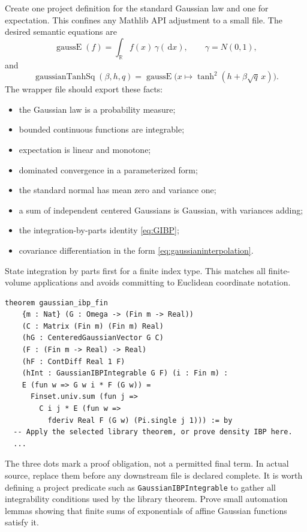 \documentclass[11pt]{article}
\numberwithin{equation}{section}
\newcommand{\R}{\mathbb{R}}
\newcommand{\1}{\mathbf 1}
\newcommand{\dd}{\,\mathrm d}
\begin{document}
Create one project definition for the standard Gaussian law and one for
expectation.  This confines any Mathlib API adjustment to a small file.
The desired semantic equations are
\[
 \operatorname{gaussE}(f)=\int_{\R} f(x)\,\gamma(\dd x),
 \qquad \gamma=N(0,1),
\]
and
\[
 \operatorname{gaussianTanhSq}(\beta,h,q)
 =\operatorname{gaussE}\bigl(x\mapsto
   \tanh^2(h+\beta\sqrt q\,x)\bigr).
\]
The wrapper file should export these facts:
\begin{itemize}[leftmargin=2em]
\item the Gaussian law is a probability measure;
\item bounded continuous functions are integrable;
\item expectation is linear and monotone;
\item dominated convergence in a parameterized form;
\item the standard normal has mean zero and variance one;
\item a sum of independent centered Gaussians is Gaussian, with variances
      adding;
\item the integration-by-parts identity \eqref{eq:GIBP};
\item covariance differentiation in the form
      \eqref{eq:gaussianinterpolation}.
\end{itemize}

State integration by parts first for a finite index type.  This matches all
finite-volume applications and avoids committing to Euclidean coordinate
notation.
\begin{lstlisting}
theorem gaussian_ibp_fin
    {m : Nat} (G : Omega -> (Fin m -> Real))
    (C : Matrix (Fin m) (Fin m) Real)
    (hG : CenteredGaussianVector G C)
    (F : (Fin m -> Real) -> Real)
    (hF : ContDiff Real 1 F)
    (hInt : GaussianIBPIntegrable G F) (i : Fin m) :
    E (fun w => G w i * F (G w)) =
      Finset.univ.sum (fun j =>
        C i j * E (fun w =>
          fderiv Real F (G w) (Pi.single j 1))) := by
  -- Apply the selected library theorem, or prove density IBP here.
  ...
\end{lstlisting}
The three dots mark a proof obligation, not a permitted final term.
In actual source, replace them before any downstream file is declared
complete.  It is worth defining a project predicate such as
\texttt{GaussianIBPIntegrable} to gather all integrability conditions used by
the library theorem.  Prove small automation lemmas showing that finite sums
of exponentials of affine Gaussian functions satisfy it.
\end{document}
